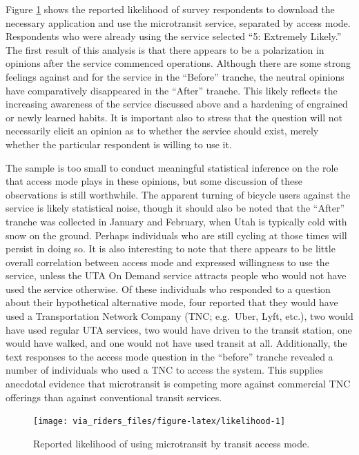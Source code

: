 \documentclass[smartcities,article,submit,moreauthors,pdftex]{mdpi}
\begin{document}
Figure \ref{fig:likelihood} shows the reported likelihood of survey respondents
to download the necessary application and use the microtransit service,
separated by access mode. Respondents who were already using the service
selected ``5: Extremely Likely.'' The first result of this analysis is that there
appears to be a polarization in opinions after the service commenced operations.
Although there are some strong feelings against and for the service in the
``Before'' tranche, the neutral opinions have comparatively disappeared in the
``After'' tranche. This likely reflects the increasing awareness of the service
discussed above and a hardening of engrained or newly learned habits. It is
important also to stress that the question will not necessarily elicit an
opinion as to whether the service should exist, merely whether the particular
respondent is willing to use it.

The sample is too small to conduct meaningful statistical inference on the role
that access mode plays in these opinions, but some discussion of these
observations is still worthwhile. The apparent turning of bicycle users against
the service is likely statistical noise, though it should also be noted that the
``After'' tranche was collected in January and February, when Utah is typically
cold with snow on the ground. Perhaps individuals who are still cycling at those
times will persist in doing so. It is also interesting to note that there
appears to be little overall correlation between access mode and expressed
willingness to use the service, unless the UTA On Demand service attracts people
who would not have used the service otherwise. Of these individuals who
responded to a question about their hypothetical alternative mode, four reported
that they would have used a Transportation Network Company (TNC; e.g.~Uber,
Lyft, etc.), two would have used regular UTA services, two would have driven to
the transit station, one would have walked, and one would not have used transit
at all. Additionally, the text responses to the access mode question in the
``before'' tranche revealed a number of individuals who used a TNC to access the
system. This supplies anecdotal evidence that microtransit is competing more
against commercial TNC offerings than against conventional transit services.

\begin{figure}
\texttt{[image: via\_riders\_files/figure-latex/likelihood-1]} \caption{Reported likelihood of using microtransit by transit access mode.}\label{fig:likelihood}
\end{figure}
\end{document}

